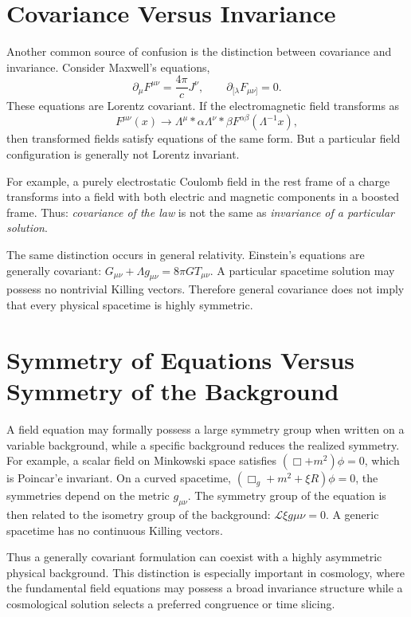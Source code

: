 \section{ Covariance Versus Invariance}
Another common source of confusion is the distinction between covariance and invariance.
Consider Maxwell's equations,
\[\partial_\mu F^{\mu\nu}=\frac{4\pi}{c}J^\nu,
\qquad\partial_{[\lambda}F_{\mu\nu]}=0.
\]
These equations are Lorentz covariant.
If the electromagnetic field transforms as
\[F^{\mu\nu}(x)\rightarrow\Lambda^\mu{}*\alpha
\Lambda^\nu{}*\beta F^{\alpha\beta}(\Lambda^{-1}x),
\]
then transformed fields satisfy equations of the same form.
But a particular field configuration is generally not Lorentz invariant.

For example, a purely electrostatic Coulomb field in the rest frame of a charge
transforms into a field with both electric and magnetic components in a boosted
frame. Thus: \emph{covariance of the law} is not the same as \emph{invariance
of a particular solution}.

The same distinction occurs in general relativity.
Einstein's equations are generally covariant:
$G_{\mu\nu}+\Lambda g_{\mu\nu}=8\pi G T_{\mu\nu}$.
A particular spacetime solution may possess no nontrivial Killing vectors.
Therefore general covariance does not imply that every physical spacetime is
highly symmetric.

\section{Symmetry of Equations Versus Symmetry of the Background}
A field equation may formally possess a large symmetry group when written on a
variable background, while a specific background reduces the realized symmetry.
For example, a scalar field on Minkowski space satisfies
$(\Box+m^2)\phi=0$, which is Poincar'e invariant.
On a curved spacetime, $(\Box_g+m^2+\xi R)\phi=0$,
the symmetries depend on the metric $g_{\mu\nu}$.
The symmetry group of the equation is then related to the isometry group of the background:
$\mathcal{L} \xi g {\mu\nu}=0$.
A generic spacetime has no continuous Killing vectors.

Thus a generally covariant formulation can coexist with a highly asymmetric physical background.
This distinction is especially important in cosmology, where the fundamental
field equations may possess a broad invariance structure while a cosmological
solution selects a preferred congruence or time slicing.

